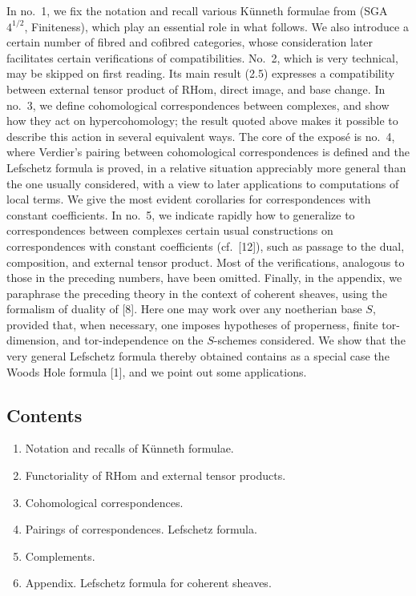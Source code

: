 \documentclass[11pt]{article}
\providecommand{\RHom}{\mathrm{RHom}}
\providecommand{\RHom}{\mathrm{RHom}}
\providecommand{\RHom}{\mathrm R\mathcal{H}om}
\begin{document}
In no.~1, we fix the notation and recall various Künneth formulae from (SGA~$4^{1/2}$, Finiteness), which play an essential role in what follows. We also introduce a certain number of fibred and cofibred categories, whose consideration later facilitates certain verifications of compatibilities. No.~2, which is very technical, may be skipped on first reading. Its main result (2.5) expresses a compatibility between external tensor product of $\RHom$, direct image, and base change. In no.~3, we define cohomological correspondences between complexes, and show how they act on hypercohomology; the result quoted above makes it possible to describe this action in several equivalent ways. The core of the exposé is no.~4, where Verdier's pairing between cohomological correspondences is defined and the Lefschetz formula is proved, in a relative situation appreciably more general than the one usually considered, with a view to later applications to computations of local terms. We give the most evident corollaries for correspondences with constant coefficients. In no.~5, we indicate rapidly how to generalize to correspondences between complexes certain usual constructions on correspondences with constant coefficients (cf.~[12]), such as passage to the dual, composition, and external tensor product. Most of the verifications, analogous to those in the preceding numbers, have been omitted. Finally, in the appendix, we paraphrase the preceding theory in the context of coherent sheaves, using the formalism of duality of [8]. Here one may work over any noetherian base $S$, provided that, when necessary, one imposes hypotheses of properness, finite tor-dimension, and tor-independence on the $S$-schemes considered. We show that the very general Lefschetz formula thereby obtained contains as a special case the Woods Hole formula [1], and we point out some applications.

\subsection*{Contents}
\begin{enumerate}[label=\arabic*.]
\item Notation and recalls of Künneth formulae.
\item Functoriality of $\RHom$ and external tensor products.
\item Cohomological correspondences.
\item Pairings of correspondences. Lefschetz formula.
\item Complements.
\item Appendix. Lefschetz formula for coherent sheaves.
\end{enumerate}
\end{document}
